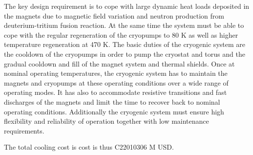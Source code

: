 The key design requirement is to cope with large dynamic heat loads deposited in the
magnets due to magnetic field variation and neutron production from deuterium-tritium
fusion reaction. At the same time the system must be able to cope with the regular
regeneration of the cryopumps to 80 K as well as higher temperature regeneration at 470 K.
The basic duties of the cryogenic system are the cooldown of the cryopumps in order
to pump the cryostat and torus and the gradual cooldown and fill of the magnet system and
thermal shields. Once at nominal operating temperatures, the cryogenic system has to
maintain the magnets and cryopumps at these operating conditions over a wide range of
operating modes. It has also to accommodate resistive transitions and fast discharges of the
magnets and limit the time to recover back to nominal operating conditions. Additionally
the cryogenic system must ensure high flexibility and reliability of operation together with
low maintenance requirements.

The total cooling cost is cost is thus C22010306 M USD.



